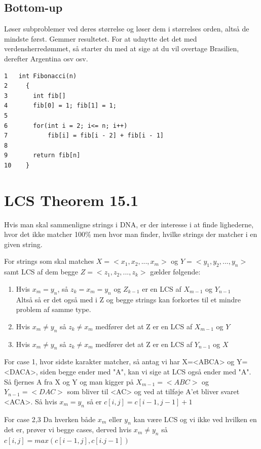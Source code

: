 \documentclass[11pt,a4paper]{report}
\theoremstyle{plain}
\theoremstyle{definition}
\theoremstyle{remark}
\numberwithin{equation}{section}
\begin{document}
\subsection{Bottom-up}
Løser subproblemer ved deres størrelse og løser dem i størrelses orden, altså de mindste først. Gemmer resultetet. For at udnytte det det med verdensherredømmet, så starter du med at sige at du vil overtage Brasilien, derefter Argentina osv osv.

\begin{lstlisting}
1   int Fibonacci(n)
2     {
3       int fib[]
4       fib[0] = 1; fib[1] = 1;
5
6       for(int i = 2; i<= n; i++)
7           fib[i] = fib[i - 2] + fib[i - 1]
8
9       return fib[n]
10    }
\end{lstlisting}




\section{LCS Theorem 15.1}
Hvis man skal sammenligne strings i DNA, er der interesse i at finde lighederne, hvor det ikke matcher 100\% men hvor man finder, hvilke strings der matcher i en given string.

For strings som skal matches $X=<x_1,x_2,...,x_m>$ og $Y=<y_1,y_2,...,y_n>$ samt LCS af dem begge $Z=<z_1,z_2,...,z_k>$ gælder følgende:
\begin{enumerate}
  \item Hvis $x_m = y_n$, så $z_k = x_m = y_n$ og $Z_{k-1}$ er en LCS af $X_{m-1}$ og $Y_{n-1}$\\
      Altså så er det også med i Z og begge strings kan forkortes til et mindre problem af samme type.
  \item Hvis $x_m \neq y_n$ så $z_k \neq x_m$ medfører det at Z er en LCS af $X_{m-1}$ og $Y$
  \item Hvis $x_m \neq y_n$ så $z_k \neq x_m$ medfører det at Z er en LCS af $Y_{n-1}$ og $X$
\end{enumerate}

For case 1, hvor sidste karakter matcher, så antag vi har X=<ABCA> og Y=<DACA>, siden begge ender med "A", kan vi sige at LCS også ender med "A". Så fjernes A fra X og Y og man kigger på $X_{m-1}=<ABC>$ og $Y_{n-1}=<DAC>$ som bliver til <AC> og ved at tilføje A'et bliver svaret <ACA>. Så hvis $x_m = y_n$ så er $c[i,j]=c[i-1,j-1] + 1$

For case 2,3 Da hverken både $x_m$ eller  $y_n$ kan være LCS og vi ikke ved hvilken en det er, prøver vi begge cases, derved hvis $x_m \neq y_n$ så $c[i,j] = max(c[i-1,j],c[i.j-1])$
\end{document}
